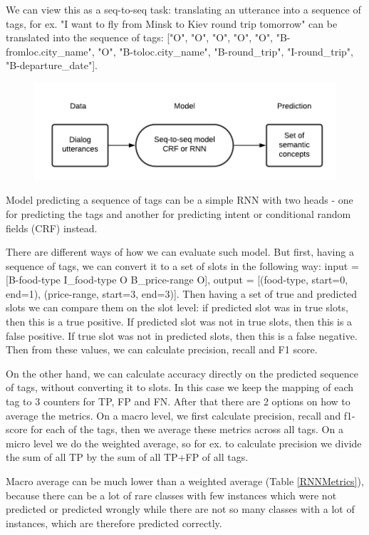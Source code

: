 \documentclass[12pt,titlepage,a4paper]{article}
\begin{document}
We can view this as a seq-to-seq task: translating an utterance into a sequence of tags, for ex. "I want to fly from Minsk to Kiev round trip tomorrow" can be translated into the sequence of tags: ["O", "O", "O", "O", "O", "B-fromloc.city\_name", "O", "B-toloc.city\_name", "B-round\_trip", "I-round\_trip", "B-departure\_date"].
\begin{figure}[h!]
    \includegraphics[width=\linewidth]{training-2-2.png}
\end{figure}

Model predicting a sequence of tags can be a simple RNN with two heads - one for predicting the tags and another for predicting intent or conditional random fields (CRF) instead.

There are different ways of how we can evaluate such model. But first, having a sequence of tags, we can convert it to a set of slots in the following way: input = [B-food-type I\_food-type O B\_price-range O], output = [(food-type, start=0, end=1), (price-range, start=3, end=3)]. Then having a set of true and predicted slots we can compare them on the slot level: if predicted slot was in true slots, then this is a true positive. If predicted slot was not in true slots, then this is a false positive. If true slot was not in predicted slots, then this is a false negative. Then from these values, we can calculate precision, recall and F1 score.

On the other hand, we can calculate accuracy directly on the predicted sequence of tags, without converting it to slots. In this case we keep the mapping of each tag to 3 counters for TP, FP and FN. After that there are 2 options on how to average the metrics. On a macro level, we first calculate precision, recall and f1-score for each of the tags, then we average these metrics across all tags. On a micro level we do the weighted average, so for ex. to calculate precision we divide the sum of all TP by the sum of all TP+FP of all tags. 

Macro average can be much lower than a weighted average (Table \ref{RNNMetrics}), because there can be a lot of rare classes with few instances which were not predicted or predicted wrongly while there are not so many classes with a lot of instances, which are therefore predicted correctly.
\end{document}
